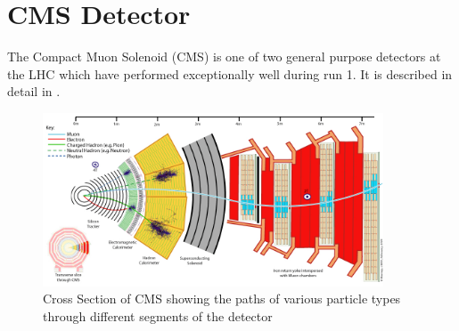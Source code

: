 
\chapter{CMS Detector} %

\label{Chapter 2} %


The Compact Muon Solenoid (CMS\cite{CMSTDR}) is one of two general purpose detectors at the LHC which have performed exceptionally well during run 1. It is described in detail in \cite{CMS}. 

\begin{figure}
\centering
    \includegraphics[width=0.9\textwidth]{./Figures/CMS_Slice.jpg}
  \caption{Cross Section of CMS showing the paths of various particle types through different segments of the detector \cite{cmsslice}}
  \label{CMS_SLICE}
\end{figure}

